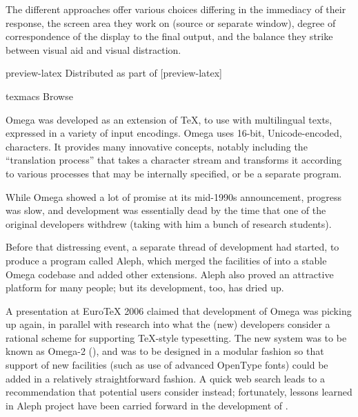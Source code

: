The different approaches offer various choices differing in the
immediacy of their response, the screen area they work on (source or
separate window), degree of correspondence of the display to the final
output, and the balance they strike between visual aid and visual
distraction.
\begin{ctanrefs}
\item[preview-latex]Distributed as part of [preview-latex]
\item[texmacs]Browse 
\end{ctanrefs}


Omega\nothtml{ (\ensuremath{\Omega})} was developed as an extension of
\TeX{}, to use with multilingual texts, expressed in a variety of
input encodings.  Omega uses 16-bit, Unicode-encoded, characters.  It
provides many innovative concepts, notably including the ``translation
process'' that takes a character stream and transforms it according to
various processes that may be internally specified, or be a separate
program.

While Omega showed a lot of promise at its mid-1990s announcement,
progress was slow, and development was essentially dead by the time
that one of the original developers withdrew (taking with him a bunch
of research students).

Before that distressing event, a separate thread of development had
started, to produce a program %
called Aleph\nothtml{ (\ensuremath{\aleph})}, which merged the facilities of
 into a stable Omega codebase and added other
extensions.  Aleph also proved an attractive platform for many people;
but its development, too, has dried up.

A presentation at Euro\TeX{} 2006 claimed that development of Omega
was picking up again, in parallel with research into what the (new)
developers consider a rational scheme for supporting \TeX{}-style
typesetting.  The new system was to be known as Omega-2
(), and was to be
designed in a modular fashion so that support of new facilities (such
as use of advanced OpenType fonts) could be added in a relatively
straightforward fashion.  A quick web search leads to a recommendation
that potential users consider  instead;
fortunately, lessons learned in Aleph project have been carried
forward in the development of \LuaTeX{}.

